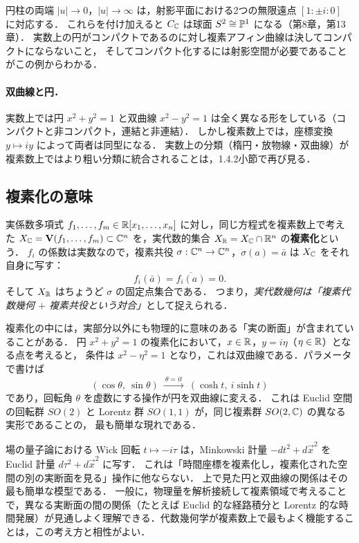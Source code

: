 円柱の両端 $|u|\to0$，$|u|\to\infty$ は，射影平面における2つの無限遠点 $[1:\pm i:0]$ に対応する．
これらを付け加えると $C_{\mathbb{C}}$ は球面 $S^2\cong\mathbb{P}^1$ になる（第8章，第13章）．
実数上の円がコンパクトであるのに対し複素アフィン曲線は決してコンパクトにならないこと，
そしてコンパクト化するには射影空間が必要であることがこの例からわかる．

\paragraph{双曲線と円．}
実数上では円 $x^2+y^2=1$ と双曲線 $x^2-y^2=1$ は全く異なる形をしている（コンパクトと非コンパクト，連結と非連結）．
しかし複素数上では，座標変換 $y\mapsto iy$ によって両者は同型になる．
実数上の分類（楕円・放物線・双曲線）が複素数上ではより粗い分類に統合されることは，1.4.2小節で再び見る．

\subsection{複素化の意味}

実係数多項式 $f_1,\dots,f_m\in\mathbb{R}[x_1,\dots,x_n]$ に対し，同じ方程式を複素数上で考えた
$X_{\mathbb{C}}=\mathbf{V}(f_1,\dots,f_m)\subset\mathbb{C}^n$ を，実代数的集合 $X_{\mathbb{R}}=X_{\mathbb{C}}\cap\mathbb{R}^n$ の\textbf{複素化}という．
$f_i$ の係数は実数なので，複素共役 $\sigma:\mathbb{C}^n\to\mathbb{C}^n$，$\sigma(a)=\bar a$ は $X_{\mathbb{C}}$ をそれ自身に写す：
\[
  f_i(\bar a)=\overline{f_i(a)}=0.
\]
そして $X_{\mathbb{R}}$ はちょうど $\sigma$ の固定点集合である．
つまり，\emph{実代数幾何は「複素代数幾何 $+$ 複素共役という対合」}として捉えられる．

複素化の中には，実部分以外にも物理的に意味のある「実の断面」が含まれていることがある．
円 $x^2+y^2=1$ の複素化において，$x\in\mathbb{R}$，$y=i\eta$（$\eta\in\mathbb{R}$）となる点を考えると，
条件は $x^2-\eta^2=1$ となり，これは双曲線である．パラメータで書けば
\[
  (\cos\theta,\ \sin\theta)\ \xrightarrow{\ \theta=i t\ }\ (\cosh t,\ i\sinh t)
\]
であり，回転角 $\theta$ を虚数にする操作が円を双曲線に変える．
これは Euclid 空間の回転群 $SO(2)$ と Lorentz 群 $SO(1,1)$ が，同じ複素群 $SO(2,\mathbb{C})$ の異なる実形であることの，
最も簡単な現れである．

\begin{physbox}[Wick回転と複素化]
場の量子論における Wick 回転 $t\mapsto -i\tau$ は，Minkowski 計量 $-dt^2+d\vec x^2$ を Euclid 計量 $d\tau^2+d\vec x^2$ に写す．
これは「時間座標を複素化し，複素化された空間の別の実断面を見る」操作に他ならない．
上で見た円と双曲線の関係はその最も簡単な模型である．
一般に，物理量を解析接続して複素領域で考えることで，異なる実断面の間の関係（たとえば Euclid 的な経路積分と
Lorentz 的な時間発展）が見通しよく理解できる．代数幾何学が複素数上で最もよく機能することは，この考え方と相性がよい．
\end{physbox}

